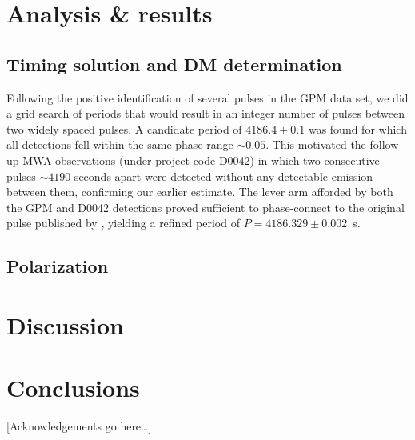 \documentclass[preprint2,linenumbers]{aastex631}
\begin{document}
\section{Analysis \& results} \label{sec:analysis}

\subsection{Timing solution and DM determination} \label{sec:timing_and_dm}

Following the positive identification of several pulses in the GPM data set, we did a grid search of periods that would result in an integer number of pulses between two widely spaced pulses.
A candidate period of $4186.4 \pm 0.1$ was found for which all detections fell within the same phase range ${\sim}0.05$.
This motivated the follow-up MWA observations (under project code D0042) in which two consecutive pulses ${\sim}4190$ seconds apart were detected without any detectable emission between them, confirming our earlier estimate.
The lever arm afforded by both the GPM and D0042 detections proved sufficient to phase-connect to the original pulse published by \citet{2024MNRAS.535..909D}, yielding a refined period of $P = 4186.329 \pm 0.002$~s.

\subsection{Polarization} \label{sec:polarization}

\section{Discussion} \label{sec:discussion}

\section{Conclusions} \label{sec:conclusions}

\begin{acknowledgments}

[Acknowledgements go here\dots]

\end{acknowledgments}

%
\end{document}
